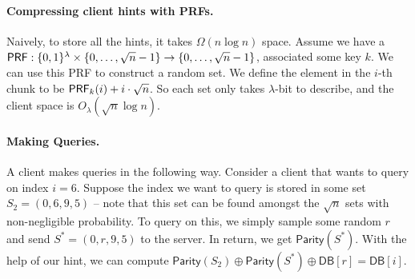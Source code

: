 






\paragraph{Compressing client hints with PRFs.}
Naively, to store all the hints, it takes $\Omega(n\log n)$ space.
Assume we have a ${\sf PRF}:\{0,1\}^\lambda\times \{0,\dots,\sqrt{n}-1\}\to \{0,\dots,\sqrt{n}-1\}$, associated some key $k$.
We can use this PRF to construct a random set.
We define the element in the $i$-th chunk to be ${\sf PRF}_k(i)+i\cdot\sqrt{n}$.
So each set only takes $\lambda$-bit to describe, and the client space is $O_\lambda(\sqrt{n}\log n)$.

\paragraph{Making Queries.}
A client makes queries in the following way. Consider a client that wants to query on index $i = 6$. Suppose the index we want to query is stored in some set $S_2 = (0, 6, 9, 5)$ -- note that this set can be found amongst the $\sqrt{n}$ sets with non-negligible probability. To query on this, we simply sample some random $r$ and send $S^* = (0, r, 9, 5)$ to the server. In return, we get $\mathsf{Parity}(S^*)$. With the help of our hint, we can compute $\mathsf{Parity}(S_2) \oplus \mathsf{Parity}(S^*) \oplus \mathsf{DB}[r] = \mathsf{DB}[i]$.

